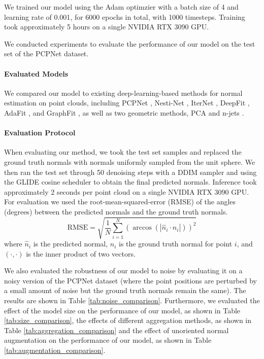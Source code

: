 \documentclass{acmart}
\begin{document}
We trained our model using the Adam optimzier with a batch size of 4 and learning rate of 0.001, for 6000 epochs in total, with 1000 timesteps. Training took approximately 5 hours on a single NVIDIA RTX 3090 GPU.

We conducted experiments to evaluate the performance of our model on the test set of the PCPNet dataset.

\paragraph{Evaluated Models}
We compared our model to existing deep-learning-based methods for normal estimation on point clouds, including PCPNet \cite{guerrero2018pcpnet}, Nesti-Net \cite{Ben-Shabat_2019_CVPR}, IterNet \cite{lenssen2020deep}, DeepFit \cite{ben2020deepfit}, AdaFit \cite{zhu2021adafit}, and GraphFit \cite{li2022graphfit}, as well as two geometric methods, PCA and n-jets \cite{CAZALS2005121}.
\paragraph{Evaluation Protocol}
When evaluating our method, we took the test set samples and replaced the ground truth normals with normals uniformly sampled from the unit sphere. We then ran the test set through 50 denoising steps with a DDIM sampler and using the GLIDE cosine scheduler \cite{DBLP:journals/corr/abs-2112-10741} to obtain the final predicted normals. Inference took approximately 2 seconds per point cloud on a single NVIDIA RTX 3090 GPU.
For evaluation we used the root-mean-squared-error (RMSE) of the angles (degrees) between the predicted normals and the ground truth normals.
\begin{equation}
    \text{RMSE} = \sqrt{\frac{1}{N}\sum_{i=1}^{N}(\arccos(|\hat{n}_i \cdot n_i|))^2}
\end{equation}
where $\hat{n}_i$ is the predicted normal, $n_i$ is the ground truth normal for point $i$, and $(\cdot, \cdot)$ is the inner product of two vectors.

We also evaluated the robustness of our model to noise by evaluating it on a noisy version of the PCPNet dataset (where the point positions are perturbed by a small amount of noise but the ground truth normals remain the same). The results are shown in Table \ref{tab:noise_comparison}. Furthermore, we evaluated the effect of the model size on the performance of our model, as shown in Table \ref{tab:size_comparison}, the effects of different aggregation methods, as shown in Table \ref{tab:aggregation_comparison} and the effect of unoriented normal augmentation on the performance of our model, as shown in Table \ref{tab:augmentation_comparison}.
\end{document}
